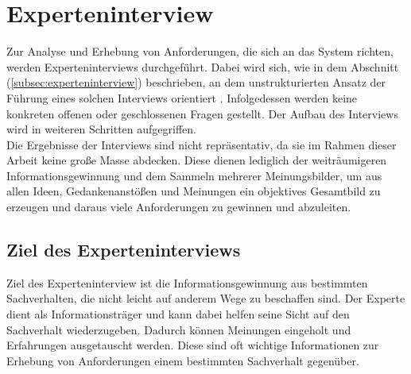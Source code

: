 \section{Experteninterview}
\label{sec:experteninterviewReqirements}
    Zur Analyse und Erhebung von Anforderungen, die sich an das System richten, werden Experteninterviews durchgeführt. 
    Dabei wird sich, wie in dem Abschnitt (\ref{subsec:experteninterview}) beschrieben, an dem unstrukturierten Ansatz der 
    Führung eines solchen Interviews orientiert \cite{robson2002real}. Infolgedessen werden keine konkreten offenen oder 
    geschlossenen Fragen gestellt. Der Aufbau des Interviews wird in weiteren Schritten aufgegriffen. 
    \\
    Die Ergebnisse der Interviews sind nicht repräsentativ, da sie im Rahmen dieser Arbeit keine große Masse abdecken. Diese 
    dienen lediglich der weiträumigeren Informationsgewinnung und dem Sammeln mehrerer Meinungsbilder, um aus allen 
    Ideen, Gedankenanstößen und Meinungen ein objektives Gesamtbild zu erzeugen und daraus viele Anforderungen zu gewinnen 
    und abzuleiten. 
\subsection{Ziel des Experteninterviews}
    Ziel des Experteninterview ist die Informationsgewinnung aus bestimmten Sachverhalten, die nicht leicht auf anderem Wege 
    zu beschaffen sind. Der Experte dient als Informationsträger und kann dabei helfen seine Sicht auf den Sachverhalt 
    wiederzugeben. Dadurch können Meinungen eingeholt und Erfahrungen ausgetauscht werden. Diese sind oft wichtige 
    Informationen zur Erhebung von Anforderungen einem bestimmten Sachverhalt gegenüber.

